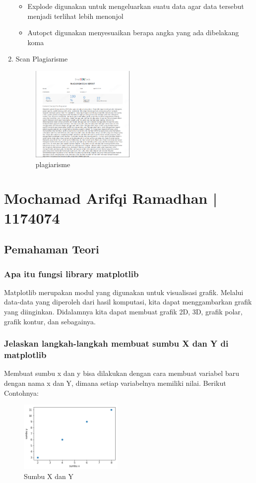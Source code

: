 \begin{enumerate}
\begin{itemize}
    \item Explode digunakan untuk mengeluarkan suatu data agar data tersebut menjadi terlihat lebih menonjol
    \item Autopct digunakan menyesuaikan berapa angka yang ada dibelakang koma
    \end{itemize}
    \item Scan Plagiarisme
    \begin{figure}[ht!]
    \includegraphics[width=5cm]{figures/6/1174084/Teori/c6_1.png}
    \centering
    \caption{plagiarisme}
    \end{figure}
    
\end{enumerate}
\section{Mochamad Arifqi Ramadhan | 1174074}
\subsection{Pemahaman Teori}

\subsubsection{Apa itu fungsi library matplotlib}
\hfill \break
Matplotlib merupakan modul yang digunakan untuk visualisasi grafik. Melalui data-data yang diperoleh dari hasil komputasi, kita dapat menggambarkan grafik yang diinginkan. Didalamnya kita dapat membuat grafik 2D, 3D, grafik polar, grafik kontur, dan sebagainya.

\subsubsection{Jelaskan langkah-langkah membuat sumbu X dan Y di matplotlib}
\hfill \break
 Membuat sumbu x dan y bisa dilakukan dengan cara membuat variabel baru dengan nama x dan Y, dimana setiap variabelnya memiliki nilai. 
Berikut Contohnya:

\begin{figure}[H]	
    \includegraphics[width=5cm]{figures/6/1174074/Teori/sumbu.png}
    \centering
    \caption{Sumbu X dan Y}
\end{figure}

